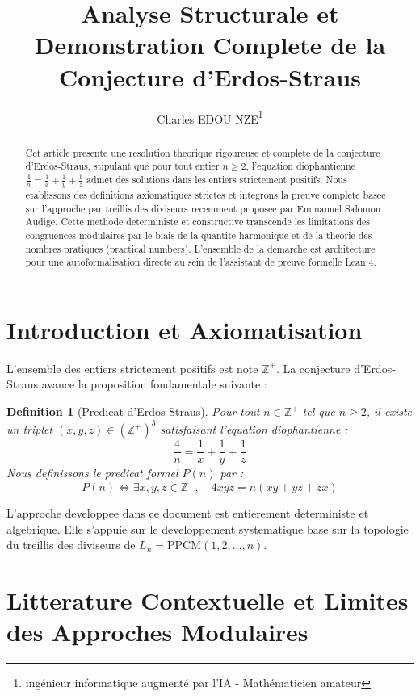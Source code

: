 \documentclass[11pt,a4paper]{article}
\title{Analyse Structurale et Demonstration Complete de la Conjecture d'Erdos-Straus}
\author{Charles EDOU NZE\thanks{ingénieur informatique augmenté par l'IA - Mathématicien amateur}}
\date{}
\newtheorem{definition}[theorem]{Definition}
\begin{document}
\maketitle

\begin{abstract}
Cet article presente une resolution theorique rigoureuse et complete de la conjecture d'Erdos-Straus, stipulant que pour tout entier $n \ge 2$, l'equation diophantienne $\frac{4}{n} = \frac{1}{x} + \frac{1}{y} + \frac{1}{z}$ admet des solutions dans les entiers strictement positifs. Nous etablissons des definitions axiomatiques strictes et integrons la preuve complete basee sur l'approche par treillis des diviseurs recemment proposee par Emmanuel Salomon Audige. Cette methode deterministe et constructive transcende les limitations des congruences modulaires par le biais de la quantite harmonique et de la theorie des nombres pratiques (practical numbers). L'ensemble de la demarche est architecture pour une autoformalisation directe au sein de l'assistant de preuve formelle Lean 4.
\end{abstract}

\tableofcontents

\section{Introduction et Axiomatisation}

L'ensemble des entiers strictement positifs est note $\mathbb{Z}^{+}$. La conjecture d'Erdos-Straus avance la proposition fondamentale suivante :

\begin{definition}[Predicat d'Erdos-Straus]
Pour tout $n \in \mathbb{Z}^{+}$ tel que $n \ge 2$, il existe un triplet $(x, y, z) \in (\mathbb{Z}^{+})^3$ satisfaisant l'equation diophantienne :
\begin{equation}
\frac{4}{n} = \frac{1}{x} + \frac{1}{y} + \frac{1}{z}
\label{eq:erdos}
\end{equation}
Nous definissons le predicat formel $P(n)$ par :
$$ P(n) \iff \exists x, y, z \in \mathbb{Z}^{+}, \quad 4xyz = n(xy + yz + zx) $$
\end{definition}

L'approche developpee dans ce document est entierement deterministe et algebrique. Elle s'appuie sur le developpement systematique base sur la topologie du treillis des diviseurs de $L_n = \text{PPCM}(1, 2, \dots, n)$.

\section{Litterature Contextuelle et Limites des Approches Modulaires}
\end{document}
